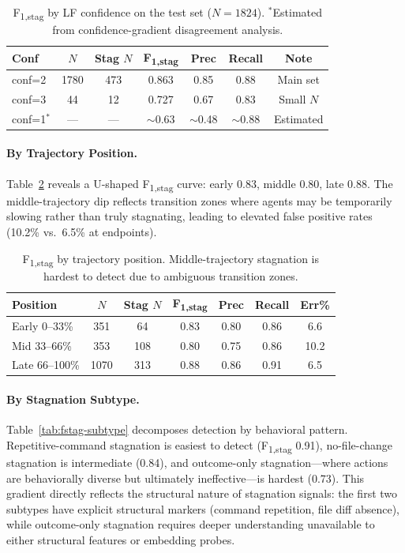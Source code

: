 \documentclass[11pt,a4paper]{article}
\newcommand{\fstagone}{F\textsubscript{1,stag}}
\begin{document}
\begin{table}[t]
\centering
\small
\begin{tabular}{lcccccc}
\toprule
Conf & $N$ & Stag $N$ & \fstagone{} & Prec & Recall & Note \\
\midrule
conf=2 & 1780 & 473 & 0.863 & 0.85 & 0.88 & Main set \\
conf=3 & 44 & 12 & 0.727 & 0.67 & 0.83 & Small $N$ \\
conf=1$^*$ & --- & --- & $\sim$0.63 & $\sim$0.48 & $\sim$0.88 & Estimated \\
\bottomrule
\end{tabular}
\caption{\fstagone{} by LF confidence on the test set ($N{=}1824$). $^*$Estimated from confidence-gradient disagreement analysis.}
\label{tab:fstag-confidence}
\end{table}

\paragraph{By Trajectory Position.}
Table~\ref{tab:fstag-position} reveals a U-shaped \fstagone{} curve: early 0.83, middle 0.80, late 0.88. The middle-trajectory dip reflects transition zones where agents may be temporarily slowing rather than truly stagnating, leading to elevated false positive rates (10.2\% vs.\ 6.5\% at endpoints).

\begin{table}[t]
\centering
\small
\begin{tabular}{lcccccc}
\toprule
Position & $N$ & Stag $N$ & \fstagone{} & Prec & Recall & Err\% \\
\midrule
Early 0--33\% & 351 & 64 & 0.83 & 0.80 & 0.86 & 6.6 \\
Mid 33--66\% & 353 & 108 & 0.80 & 0.75 & 0.86 & 10.2 \\
Late 66--100\% & 1070 & 313 & 0.88 & 0.86 & 0.91 & 6.5 \\
\bottomrule
\end{tabular}
\caption{\fstagone{} by trajectory position. Middle-trajectory stagnation is hardest to detect due to ambiguous transition zones.}
\label{tab:fstag-position}
\end{table}

\paragraph{By Stagnation Subtype.}
Table~\ref{tab:fstag-subtype} decomposes detection by behavioral pattern. Repetitive-command stagnation is easiest to detect (\fstagone{} 0.91), no-file-change stagnation is intermediate (0.84), and outcome-only stagnation---where actions are behaviorally diverse but ultimately ineffective---is hardest (0.73). This gradient directly reflects the structural nature of stagnation signals: the first two subtypes have explicit structural markers (command repetition, file diff absence), while outcome-only stagnation requires deeper understanding unavailable to either structural features or embedding probes.
\end{document}
